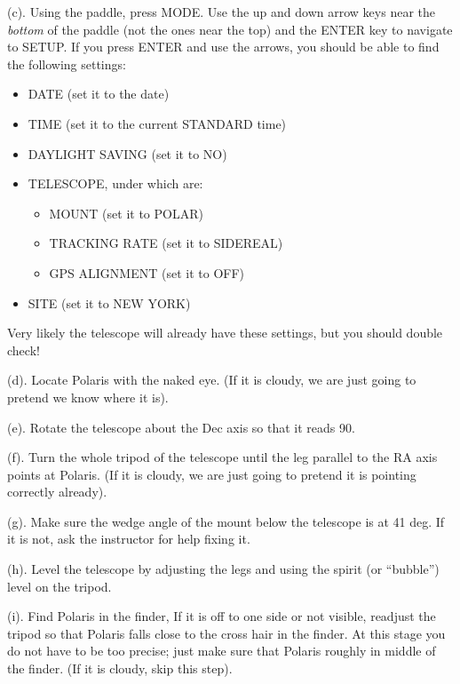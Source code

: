 \medskip\noindent (c). Using the paddle, press MODE. Use the up and
down arrow keys near the {\it bottom} of the paddle (not the ones near
the top) and the ENTER key to navigate to SETUP. If you press ENTER
and use the arrows, you should be able to find the following settings:
\begin{itemize}
\item DATE (set it to the date)
\item TIME (set it to the current STANDARD time)
\item DAYLIGHT SAVING (set it to NO)
\item TELESCOPE, under which are:
\begin{itemize}
  \item MOUNT (set it to POLAR)
  \item TRACKING RATE (set it to SIDEREAL)
  \item GPS ALIGNMENT (set it to OFF)
\end{itemize}
\item SITE (set it to NEW YORK)
\end{itemize}
Very likely the telescope will already have these settings, but you
should double check!

\medskip\noindent
(d). Locate Polaris with the naked eye. (If it is cloudy, we are just
going to pretend we know where it is).

\medskip\noindent
(e). Rotate the telescope about the Dec axis so that it reads
90\deg.

\medskip\noindent (f). Turn the whole tripod of the telescope until
the leg parallel to the RA axis points at Polaris. (If it is cloudy,
we are just going to pretend it is pointing correctly already).

\medskip\noindent
(g). Make sure the wedge angle of the mount below the telescope is at
41 deg. If it is not, ask the instructor for help fixing it.

\medskip\noindent (h). Level the telescope by adjusting the legs and
using the spirit (or ``bubble'') level on the tripod. 

\medskip\noindent (i).  Find Polaris in the finder, If it is off to
one side or not visible, readjust the tripod so that Polaris falls
close to the cross hair in the finder. At this stage you do not have
to be too precise; just make sure that Polaris roughly in middle of
the finder. (If it is cloudy, skip this step).

